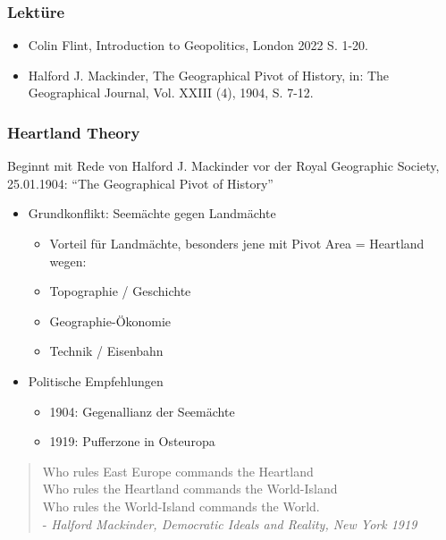 {}\documentclass[a4paper]{article}
\providecommand{\tightlist}{\setlength{\itemsep}{1mm}\setlength{\parskip}{1mm}}
\begin{document}
\subsubsection{Lektüre}\label{lektuxfcre-1}

\begin{itemize}
	\tightlist
	\item
	      Colin Flint, Introduction to Geopolitics, London 2022 S. 1-20.
	\item
	      Halford J. Mackinder, The Geographical Pivot of History, in: The
	      Geographical Journal, Vol. XXIII (4), 1904, S. 7-12.
\end{itemize}

\subsubsection{Heartland Theory}\label{heartland-theory}

Beginnt mit Rede von Halford J. Mackinder vor der Royal Geographic
Society, 25.01.1904: ``The Geographical Pivot of History''

\begin{itemize}
	\tightlist
	\item
	      Grundkonflikt: Seemächte gegen Landmächte

	      \begin{itemize}
		      \tightlist
		      \item
		            Vorteil für Landmächte, besonders jene mit Pivot Area = Heartland
		            wegen:
		      \item
		            Topographie / Geschichte
		      \item
		            Geographie-Ökonomie
		      \item
		            Technik / Eisenbahn
	      \end{itemize}
	\item
	      Politische Empfehlungen

	      \begin{itemize}
		      \tightlist
		      \item
		            1904: Gegenallianz der Seemächte
		      \item
		            1919: Pufferzone in Osteuropa
	      \end{itemize}
\end{itemize}

\begin{quote}
	Who rules East Europe commands the Heartland\\
	Who rules the Heartland commands the World-Island\\
	Who rules the World-Island commands the World.\\
	- \emph{Halford Mackinder, Democratic Ideals and Reality, New York 1919}
\end{quote}
\end{document}
